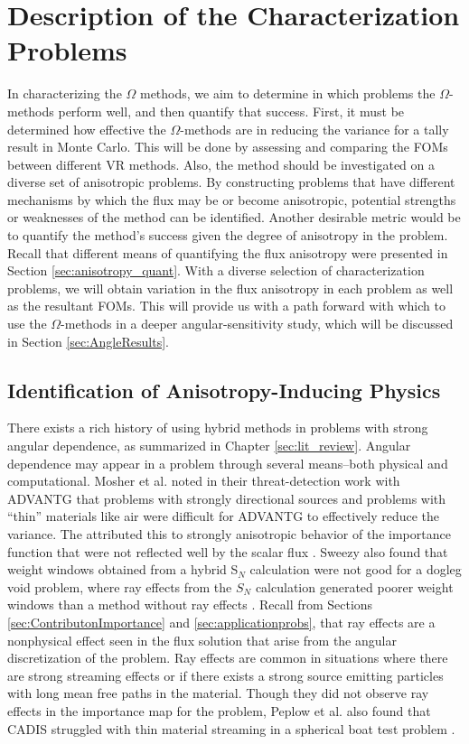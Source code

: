 \section{Description of the Characterization Problems}
\label{sec:AngleProbDesc}

In characterizing the $\Omega$ methods, we aim to determine in which problems
the $\Omega$-methods perform well, and then quantify that success.
First, it must be determined how effective the
$\Omega$-methods are in reducing the variance for a tally result in Monte Carlo.
This will be done by assessing and comparing the FOMs between different VR methods.
Also, the method should be investigated on a diverse set of anisotropic
problems. By constructing problems that have
different mechanisms by which the flux may be or become
anisotropic, potential strengths or weaknesses of the method can be identified.
Another desirable metric would be to quantify the method's success given the
degree of anisotropy in the problem. Recall that different
means of quantifying the flux
anisotropy were presented in Section \ref{sec:anisotropy_quant}. With a diverse
selection of characterization problems, we will obtain variation in the flux
anisotropy in each problem as well as the resultant FOMs. This will provide us
with a path forward with which to use the $\Omega$-methods in a deeper
angular-sensitivity study, which will be discussed in Section
\ref{sec:AngleResults}.

\subsection{Identification of Anisotropy-Inducing Physics}
\label{subsec:AngleProbID}

There exists a rich history of using hybrid methods in problems with strong
angular dependence, as summarized in Chapter \ref{sec:lit_review}. Angular
dependence may appear in a problem through several means--both physical and
computational.
Mosher et al. noted in their threat-detection work with ADVANTG
that problems with strongly directional sources and
problems with ``thin'' materials like air were difficult for ADVANTG to effectively
reduce the variance. The attributed this to strongly anisotropic behavior of the
importance function that were not reflected well by the scalar flux
\cite{mosher_automated_2009}. Sweezy also found that weight windows obtained
from a hybrid S$_N$ calculation were not good for a dogleg void problem,
where ray effects from the $S_N$ calculation generated poorer weight windows
than a method without ray effects \cite{sweezy_automated_2005}. Recall from
Sections \ref{sec:ContributonImportance} and \ref{sec:applicationprobs}, that ray
effects are a nonphysical effect seen in the flux solution that arise from
the angular discretization of the problem.
Ray effects are common in situations where there are strong
streaming effects or if there exists a strong source emitting particles with
long mean free paths in the material. Though they did not observe ray effects in
the importance map for the problem, Peplow et
al. also found that CADIS struggled with thin material streaming in a spherical
boat test problem \cite{peplow_consistent_2012}.

